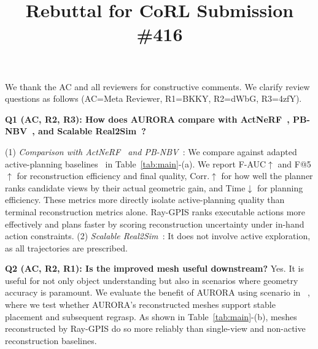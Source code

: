 \documentclass[conference]{IEEEtran}
\newcommand{\newparagraph}[1]{{\bf #1.}}
\begin{document}
\title{Rebuttal for CoRL Submission \#416\vspace{-1cm}}
\maketitle
\thispagestyle{empty}

We thank the AC and all reviewers for constructive comments.
We clarify review questions as follows (AC=Meta Reviewer, R1=BKKY, R2=dWbG, R3=4zfY).


{\color{blue}\newparagraph{1. Additional Baselines \& Downstream Value}}

\textbf{Q1 (AC, R2, R3): How does AURORA compare with ActNeRF~\cite{actnerf}, PB-NBV~\cite{pbnbv}, and Scalable Real2Sim~\cite{pfaff2025_scalable_real2sim}?}

(1) \emph{Comparison with ActNeRF~\cite{actnerf} and PB-NBV~\cite{pbnbv}}: We compare against adapted active-planning baselines~\cite{actnerf,pbnbv} in Table~\ref{tab:main}-(a). We report F-AUC$\uparrow$ and F@5$\uparrow$ for reconstruction efficiency and final quality, {\color{red}Corr.$\uparrow$ for how well the planner ranks candidate views by their actual geometric gain}, and Time$\downarrow$ for planning efficiency. These metrics more directly isolate active-planning quality than terminal reconstruction metrics alone. Ray-GPIS ranks executable actions more effectively and plans faster by scoring reconstruction uncertainty under in-hand action constraints.
(2) \emph{Scalable Real2Sim~\cite{pfaff2025_scalable_real2sim}}: It does not involve active exploration, as all trajectories are prescribed.


\textbf{Q2 (AC, R2, R1): Is the improved mesh useful downstream?}
Yes. It is useful for not only object understanding but also in scenarios where geometry accuracy is paramount. We evaluate the benefit of AURORA using scenario in ~\cite{gualtieri2021robotic}, where we test whether
AURORA's reconstructed meshes support stable placement and subsequent regrasp.
As shown in Table~\ref{tab:main}-(b), meshes reconstructed by Ray-GPIS do so
more reliably than single-view and non-active reconstruction baselines.

\end{document}
